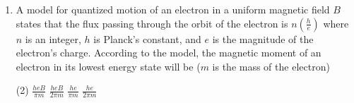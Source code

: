 \begin{enumerate}[leftmargin=*]
\item[$\Omega.$] A model for quantized motion of an electron in a uniform magnetic field $B$ states that the flux passing through the orbit of the electron is $n\left(\frac{h}{e}\right)$ where $n$ is an integer, $h$ is Planck's constant, and $e$ is the magnitude of the electron's charge. According to the model, the magnetic moment of an electron in its lowest energy state will be ($m$ is the mass of the electron)
\begin{tasks}(2)
    \task $\frac{heB}{\pi m}$
    \task $\frac{heB}{2\pi m}$
    \task $\frac{he}{\pi m}$
    \task $\frac{he}{2\pi m}$ 
\end{tasks}
\end{enumerate}
